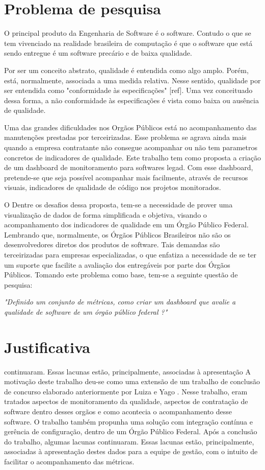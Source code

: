 \section{Problema de pesquisa}
O principal produto da Engenharia de Software é o software. Contudo o que se tem vivenciado na realidade brasileira de computação é que o software que está sendo entregue é um software precário e de baixa qualidade.

 Por ser um conceito abstrato, qualidade é entendida como algo amplo. Porém, está, normalmente, associada a uma medida relativa. Nesse sentido, qualidade por ser entendida como "conformidade às especificações" [ref]. Uma vez conceituado dessa forma, a não conformidade às especificações é vista como baixa ou ausência de qualidade.

 Uma das grandes dificuldades nos Orgãos Públicos está no acompanhamento das manutenções prestadas por terceirizadas. Esse problema se agrava ainda mais quando a empresa contratante não consegue acompanhar ou não tem parametros concretos de indicadores de qualidade. 
Este trabalho tem como proposta a criação de um dashboard de monitoramento para softwares legad. Com esse dashboard, pretende-se que seja possível acompanhar mais facilmente, através de recursos visuais, indicadores de qualidade de código nos projetos monitorados.

O Dentre os desafios dessa proposta, tem-se a necessidade de prover uma visualização de dados de forma simplificada e objetiva, visando o acompanhamento dos indicadores de qualidade em um Órgão Público Federal.  Lembrando que, normalmente, os Órgãos Públicos Brasileiros não são os desenvolvedores diretos dos produtos de software. Tais demandas são terceirizadas para empresas especializadas, o que enfatiza a necessidade de se ter um suporte que facilite a avaliação dos entregáveis por parte dos Órgãos Públicos. Tomando este problema como base, tem-se a seguinte questão de pesquisa:
	
	\begin{center}
	\textit{"Definido um conjunto de métricas, como criar um dashboard que avalie a qualidade de software de um órgão público federal ?"}	
	\end{center}

\section{Justificativa}
continuaram. Essas lacunas estão, principalmente, associadas à apresentação
	A motivação deste trabalho deu-se como uma extensão de um trabalho de conclusão de concurso elaborado anteriormente por Luiza e Yago \cite{luiza_yago}. Nesse trabalho, eram tratados aspectos de monitoramento da qualidade, aspectos de contratação de software dentro desses orgãos e como acontecia o acompanhamento desse software. O trabalho também propunha uma solução com integração contínua e gerência de configuração, dentro de um Órgão Público Federal. Após a conclusão do trabalho, algumas lacunas continuaram. Essas lacunas estão, principalmente, associadas à apresentação destes dados para a equipe de gestão, com o intuito de facilitar o acompanhamento das métricas.

